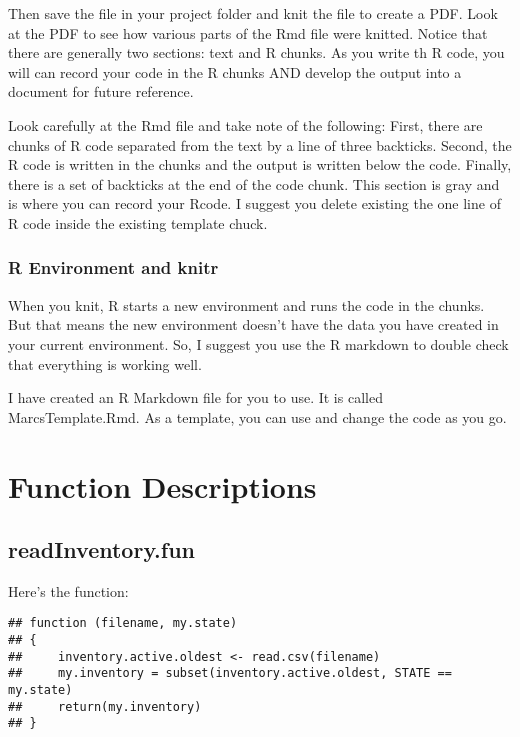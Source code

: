 \documentclass{article}\usepackage[]{graphicx}\usepackage[dvipsnames]{xcolor}
\makeatletter
\newenvironment{kframe}{%
 \def\at@end@of@kframe{}%
 \ifinner\ifhmode%
  \def\at@end@of@kframe{\end{minipage}}%
  \begin{minipage}{\columnwidth}%
 \fi\fi%
 \def\FrameCommand##1{\hskip\@totalleftmargin \hskip-\fboxsep
 \colorbox{shadecolor}{##1}\hskip-\fboxsep
     \hskip-\linewidth \hskip-\@totalleftmargin \hskip\columnwidth}%
 \MakeFramed {\advance\hsize-\width
   \@totalleftmargin\z@ \linewidth\hsize
   \@setminipage}}%
 {\par\unskip\endMakeFramed%
 \at@end@of@kframe}
\newenvironment{knitrout}{}{} %
\makeatother
\begin{document}
Then save the file in your project folder and knit the file to create a PDF. Look at the PDF to see how various parts of the Rmd file were knitted. Notice that there are generally two sections: text and R chunks. As you write th R code, you will can record your code in the R chunks AND develop the output into a document for future reference.

Look carefully at the Rmd file and take note of the following: First, there are chunks of R code separated from the text by a line of three backticks. Second, the R code is written in the chunks and the output is written below the code. Finally, there is a set of backticks at the end of the code chunk. This section is gray and is where you can record your Rcode. I suggest you delete existing the one line of R code inside the existing template chuck.  

\subsubsection{R Environment and knitr}

When you knit, R starts a new environment and runs the code in the chunks. But that means the new environment doesn't have the data you have created in your current environment. So, I suggest you use the R markdown to double check that everything is working well. 

I have created an R Markdown file for you to use. It is called MarcsTemplate.Rmd. As a template, you can use and change the code as you go. 

\section{Function Descriptions}

\subsection{readInventory.fun}\label{subsec:readInventory}

Here's the function:

\begin{knitrout}
\color{fgcolor}\begin{kframe}
\begin{verbatim}
## function (filename, my.state) 
## {
##     inventory.active.oldest <- read.csv(filename)
##     my.inventory = subset(inventory.active.oldest, STATE == my.state)
##     return(my.inventory)
## }
\end{verbatim}
\end{kframe}
\end{knitrout}
\end{document}

